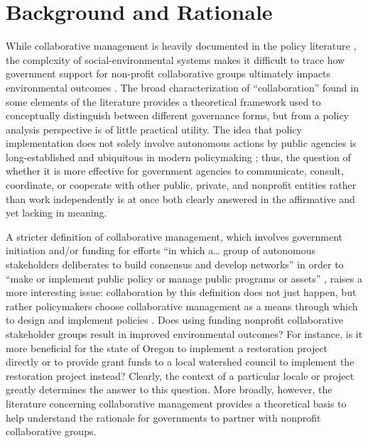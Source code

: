 \documentclass[11pt,a4paper,titlepage]{article}
\begin{document}
\section*{Background and Rationale}

While collaborative management is heavily documented in the policy literature \parencite{emerson2012,margerum2011,sabatier2005,ansell2008,lubell2004}, the complexity of social-environmental systems makes it difficult to trace how government support for non-profit collaborative groups ultimately impacts environmental outcomes \parencite{koontz2006}. The broad characterization of “collaboration” found in some elements of the literature \parencite{donahue2011, agranoff2003} provides a theoretical framework used to conceptually distinguish between different governance forms, but from a policy analysis perspective is of little practical utility. The idea that policy implementation does not solely involve autonomous actions by public agencies is long-established \parencite[e.g.,][]{ostrom1961} and ubiquitous in modern policymaking \parencite{salamon2002}; thus, the question of whether it is more effective for government agencies to communicate, consult, coordinate, or cooperate with other public, private, and nonprofit entities rather than work independently is at once both clearly answered in the affirmative and yet lacking in meaning.

A stricter definition of collaborative management, which involves government initiation and/or funding \parencite{ansell2008} for efforts “in which a… group of autonomous stakeholders deliberates to build consensus and develop networks” \parencite[p. 6]{margerum2011} in order to “make or implement public policy or manage public programs or assets” \parencite[p. 544]{ansell2008}, raises a more interesting issue: collaboration by this definition does not just happen, but rather policymakers choose collaborative management as a means through which to design and implement policies \parencite{layzer2008, hoornbeek2012, koontz2004}. Does using funding nonprofit collaborative stakeholder groups result in improved environmental outcomes? For instance, is it more beneficial for the state of Oregon to implement a restoration project directly or to provide grant funds to a local watershed council to implement the restoration project instead? Clearly, the context of a particular locale or project greatly determines the answer to this question. More broadly, however, the literature concerning collaborative management provides a theoretical basis to help understand the rationale for governments to partner with nonprofit collaborative groups.
\end{document}
